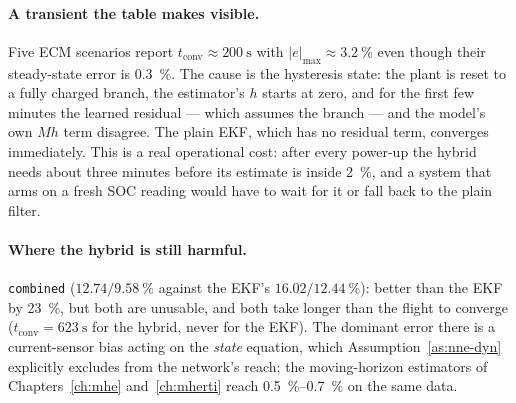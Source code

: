 \paragraph{A transient the table makes visible.}  Five ECM scenarios report
$t_\text{conv} \approx \SI{200}{\second}$ with $|e|_{\max} \approx \SI{3.2}{\percent}$ even though
their steady-state error is \SI{0.3}{\percent}.  The cause is the hysteresis state: the plant is
reset to a fully charged branch, the estimator's $h$ starts at zero, and for the first few minutes
the learned residual --- which assumes the branch --- and the model's own $M h$ term disagree.  The
plain EKF, which has no residual term, converges immediately.  This is a real operational cost:
after every power-up the hybrid needs about three minutes before its estimate is inside
\SI{2}{\percent}, and a system that arms on a fresh SOC reading would have to wait for it or
fall back to the plain filter.

\paragraph{Where the hybrid is still harmful.}  \texttt{combined} ($12.74/\SI{9.58}{\percent}$
against the EKF's $16.02/\SI{12.44}{\percent}$): better than the EKF by \SI{23}{\percent}, but both
are unusable, and both take longer than the flight to converge ($t_\text{conv} = \SI{623}{\second}$
for the hybrid, never for the EKF).  The dominant error there is a current-sensor bias acting on
the \emph{state} equation, which Assumption~\ref{as:nne-dyn} explicitly excludes from the network's
reach; the moving-horizon estimators of Chapters~\ref{ch:mhe} and~\ref{ch:mherti} reach
\SIrange{0.5}{0.7}{\percent} on the same data.

